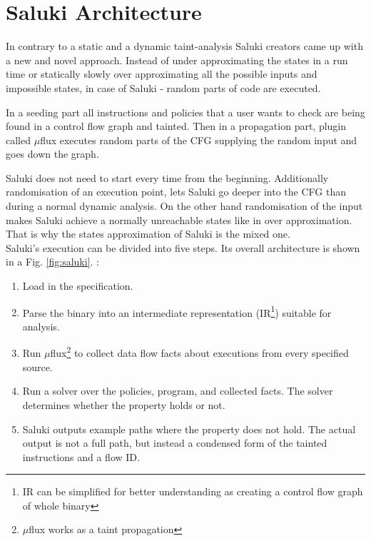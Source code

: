 \documentclass[a4paper, 12pt, journal, onecolumn]{IEEEtran}
\begin{document}
\section{Saluki Architecture}

In contrary to a static and a dynamic taint-analysis Saluki creators came up with a new and novel approach. Instead of under approximating the states in a run time or statically slowly over approximating all the possible inputs and impossible states, in case of Saluki - random parts of code are executed. 

In a seeding part all instructions and policies that a user wants to check are being found in a control flow graph and tainted. Then in a propagation part, plugin called $\mu$flux executes random parts of the CFG supplying the random input and goes down the graph. 

Saluki does not need to start every time from the beginning. Additionally randomisation of an execution point, lets Saluki go deeper into the CFG than during a normal dynamic analysis. On the other hand randomisation of the input makes Saluki achieve a normally unreachable states like in over approximation. That is why the states approximation of Saluki is the mixed one.
\\

Saluki's execution can be divided into five steps.
Its overall architecture is shown in a Fig. \ref{fig:saluki}.  \cite{saluki} :

\begin{enumerate}[label=\Alph*]
\item Load in the specification.
\item Parse the binary into an intermediate representation (IR\footnote{IR can be simplified for better understanding as creating a control flow graph of whole binary}) suitable for analysis. 
\item Run $\mu$flux\footnote{$\mu$flux works as a taint propagation} to collect data flow facts about executions from every specified source.
\item Run a solver over the policies, program, and collected facts. The solver determines whether the property holds or not.
\item Saluki outputs example paths where the property does not hold. The actual output is not a full path, but instead a condensed form of the tainted instructions and a flow ID.
\end{enumerate}
\end{document}
